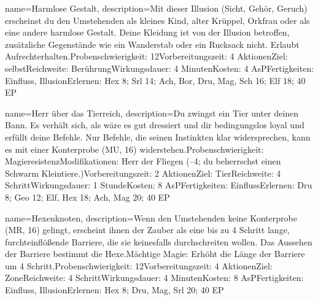 {
    name={Harmlose Gestalt},
    description={Mit dieser Illusion (Sicht, Gehör, Geruch) erscheinst du den Umstehenden als kleines Kind, alter Krüppel, Orkfrau oder als eine andere harmlose Gestalt. Deine Kleidung ist von der Illusion betroffen, zusätzliche Gegenstände wie ein Wanderstab oder ein Rucksack nicht. Erlaubt Aufrechterhalten.\newline Probenschwierigkeit: 12\newline Vorbereitungszeit: 4 Aktionen\newline Ziel: selbst\newline Reichweite: Berührung\newline Wirkungsdauer: 4 Minuten\newline Kosten: 4 AsP\newline Fertigkeiten: Einfluss, Illusion\newline Erlernen: Hex 8; Srl 14; Ach, Bor, Dru, Mag, Sch 16; Elf 18; 40 EP}
}


{
    name={Herr über das Tierreich},
    description={Du zwingst ein Tier unter deinen Bann. Es verhält sich, als wäre es gut dressiert und dir bedingungslos loyal und erfüllt deine Befehle. Nur Befehle, die seinen Instinkten klar widersprechen, kann es mit einer Konterprobe (MU, 16) widerstehen.\newline Probenschwierigkeit: Magieresistenz\newline Modifikationen: Herr der Fliegen (–4; du beherrschst einen Schwarm Kleintiere.)\newline Vorbereitungszeit: 2 Aktionen\newline Ziel: Tier\newline Reichweite: 4 Schritt\newline Wirkungsdauer: 1 Stunde\newline Kosten: 8 AsP\newline Fertigkeiten: Einfluss\newline Erlernen: Dru 8; Geo 12; Elf, Hex 18; Ach, Mag 20; 40 EP}
}


{
    name={Hexenknoten},
    description={Wenn den Umstehenden keine Konterprobe (MR, 16) gelingt, erscheint ihnen der Zauber als eine bis zu 4 Schritt lange, furchteinflößende Barriere, die sie keinesfalls durchschreiten wollen. Das Aussehen der Barriere bestimmt die Hexe.\newline Mächtige Magie: Erhöht die Länge der Barriere um 4 Schritt.\newline Probenschwierigkeit: 12\newline Vorbereitungszeit: 4 Aktionen\newline Ziel: Zone\newline Reichweite: 4 Schritt\newline Wirkungsdauer: 4 Minuten\newline Kosten: 8 AsP\newline Fertigkeiten: Einfluss, Illusion\newline Erlernen: Hex 8; Dru, Mag, Srl 20; 40 EP}
}


